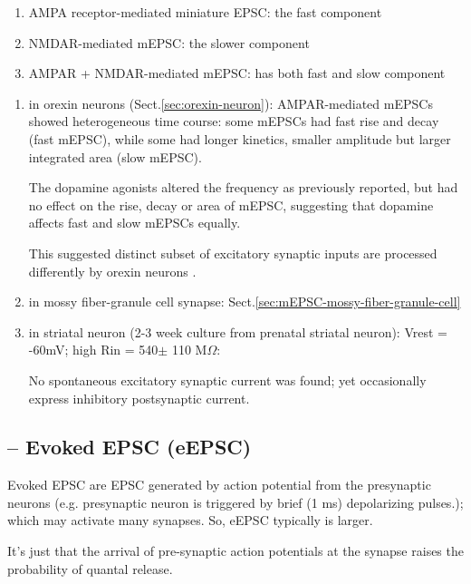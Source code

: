 \begin{enumerate}
  \item  AMPA receptor-mediated miniature EPSC: the fast component
  
  \item NMDAR-mediated mEPSC: the slower component
  
  \item AMPAR + NMDAR-mediated mEPSC: has both fast and slow component
\end{enumerate}


\begin{enumerate}
  
  \item in orexin neurons (Sect.\ref{sec:orexin-neuron}): AMPAR-mediated mEPSCs
  showed heterogeneous time course:  some mEPSCs had fast rise and decay (fast
  mEPSC), while some had longer kinetics, smaller amplitude but larger
  integrated area (slow mEPSC).
  
  The dopamine agonists altered the frequency as previously reported, but had no
  effect on the rise, decay or area of mEPSC, suggesting that dopamine affects
  fast and slow mEPSCs equally.
  
  This suggested distinct subset of excitatory synaptic inputs are processed
  differently by orexin neurons .
  
  \item in mossy fiber-granule cell synapse:
  Sect.\ref{sec:mEPSC-mossy-fiber-granule-cell}
  
  
  \item in striatal neuron (2-3 week culture from prenatal striatal neuron):
  Vrest = -60mV; high Rin = 540$\pm$ 110 M$\Omega$:
  
  No spontaneous excitatory synaptic current was found; yet occasionally express
  inhibitory postsynaptic current.
  
  
  
\end{enumerate}

\subsection{-- Evoked EPSC (eEPSC)}
\label{sec:eEPSC}

Evoked EPSC are EPSC generated by action potential from the presynaptic neurons
(e.g. presynaptic neuron is triggered by brief (1 ms) depolarizing pulses.);
which may activate many synapses. So, eEPSC typically is larger.

It's just that the arrival of pre-synaptic action potentials at the synapse
raises the probability of quantal release.

